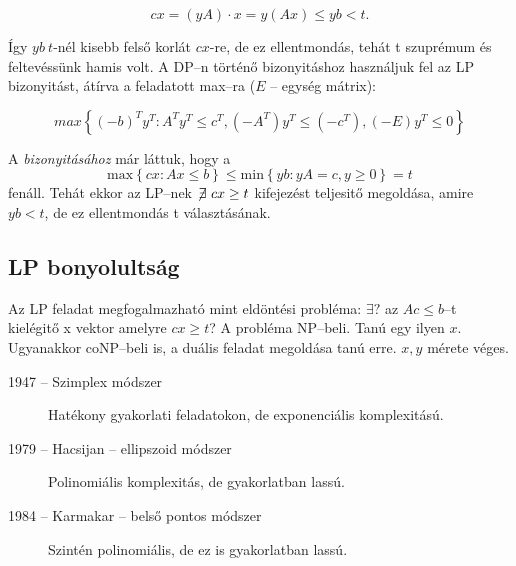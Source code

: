 \[ cx = (yA)\cdot x = y (Ax) \leq yb < t.\]

Így $yb~t$-nél kisebb felső korlát $cx$-re, de ez ellentmondás, tehát t szuprémum és
feltevéssünk hamis volt. A DP--n történő bizonyitáshoz használjuk fel az LP bizonyitást, 
átírva a feladatott max--ra ($E$ -- egység mátrix):

\[ max \left\{ (-b)^T y^T : A^T y^T \leq c^T, (-A^T) y^T \leq (-c^T),
(-E)y^T \leq 0 \right\} \]
 
A  \emph{bizonyitásához} már láttuk, hogy a \[ \mbox{max}\left\{
cx:Ax \leq b \right\} \leq
   \mbox{min}\left\{ yb:yA = c, y \geq 0 \right\}=t
\] fenáll. Tehát ekkor az LP--nek $\not\!\exists~cx \geq t$ kifejezést teljesitő
megoldása, amire $yb<t$, de ez ellentmondás t választásának.

\subsection{LP bonyolultság}

Az LP feladat megfogalmazható mint eldöntési probléma: $\exists?$ az $Ac \leq
b$--t kielégitő x vektor amelyre $cx\geq t$? A probléma NP--beli. Tanú egy ilyen
$x$. Ugyanakkor coNP--beli is, a duális feladat megoldása tanú erre. $x, y$
mérete véges.

\begin{description}
  \item[1947 -- Szimplex módszer] Hatékony gyakorlati feladatokon, de exponenciális komplexitású.
  \item[1979 --  Hacsijan -- ellipszoid módszer] Polinomiális komplexitás, de gyakorlatban lassú.
  \item[1984 --  Karmakar -- belső pontos módszer] Szintén polinomiális, de ez is gyakorlatban lassú.
\end{description}